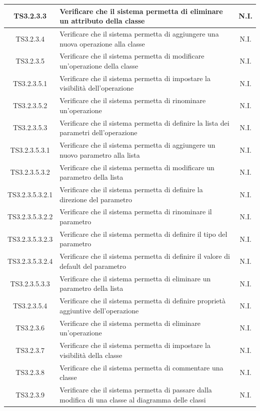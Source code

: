 \documentclass[../PianoDiQualifica.tex]{subfiles}
\begin{document}
\begin{longtable}{|c|>{\centering}p{10cm}|c|}
	\hline
	TS3.2.3.3 & Verificare che il sistema permetta di eliminare un attributo della classe & N.I. \\
	\hline
	TS3.2.3.4 & Verificare che il sistema permetta di aggiungere una nuova operazione alla classe & N.I. \\
	\hline
	TS3.2.3.5 & Verificare che il sistema permetta di modificare un'operazione della classe & N.I. \\
	\hline
	TS3.2.3.5.1 & Verificare che il sistema permetta di impostare la visibilità dell'operazione & N.I. \\
	\hline
	TS3.2.3.5.2 & Verificare che il sistema permetta di rinominare un'operazione & N.I. \\
	\hline
	TS3.2.3.5.3 & Verificare che il sistema permetta di definire la lista dei parametri dell'operazione & N.I. \\
	\hline
	TS3.2.3.5.3.1 & Verificare che il sistema permetta di aggiungere un nuovo parametro alla lista & N.I. \\
	\hline
	TS3.2.3.5.3.2 & Verificare che il sistema permetta di modificare un parametro della lista & N.I. \\
	\hline
	TS3.2.3.5.3.2.1 & Verificare che il sistema permetta di definire la direzione del parametro & N.I. \\
	\hline
	TS3.2.3.5.3.2.2 & Verificare che il sistema permetta di rinominare il parametro & N.I. \\
	\hline
	TS3.2.3.5.3.2.3 & Verificare che il sistema permetta di definire il tipo del parametro & N.I. \\
	\hline
	TS3.2.3.5.3.2.4 & Verificare che il sistema permetta di definire il valore di default del parametro & N.I. \\
	\hline
	TS3.2.3.5.3.3 & Verificare che il sistema permetta di eliminare un parametro della lista & N.I. \\
	\hline
	TS3.2.3.5.4 & Verificare che il sistema permetta di definire proprietà aggiuntive dell'operazione & N.I. \\
	\hline
	TS3.2.3.6 & Verificare che il sistema permetta di eliminare un'operazione & N.I. \\
	\hline
	TS3.2.3.7 & Verificare che il sistema permetta di impostare la visibilità della classe & N.I. \\
	\hline
	TS3.2.3.8 & Verificare che il sistema permetta di commentare una classe & N.I. \\
	\hline
	TS3.2.3.9 & Verificare che il sistema permetta di passare dalla modifica di una classe al diagramma delle classi & N.I. \\

\end{longtable}
\end{document}
